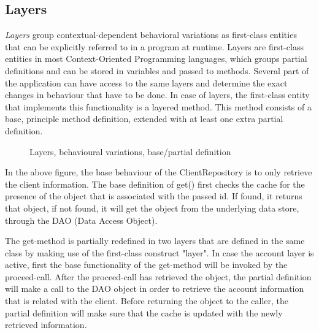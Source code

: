 \documentclass{acm_proc_article-sp}
\begin{document}
\subsection{Layers}
\textit{Layers} group contextual-dependent behavioral variations as first-class entities that can be explicitly referred to in a program at runtime. Layers are first-class entities in most Context-Oriented Programming languages, which groups partial definitions and can be stored in variables and passed to methods. Several part of the application can have access to the same layers and determine the exact changes in behaviour that have to be done. In case of layers, the first-class entity that implements this functionality is a layered method. This method consists of a base, principle method definition, extended with at least one extra partial definition.

\begin{figure}[H]
\centering
{}
\caption{Layers, behavioural variations, base/partial definition}
\end{figure}

In the above figure, the base behaviour of the ClientRepository is to only retrieve the client information. The base definition of get() first checks the cache for the presence of the object that is associated with the passed id. If found, it returns that object, if not found, it will get the object from the underlying data store, through the DAO (Data Access Object). 

The get-method is partially redefined in two layers that are defined in the same class by making use of the first-class construct "layer". In case the account layer is active, first the base functionality of the get-method will be invoked by the proceed-call. After the proceed-call has retrieved the object, the partial definition will make a call to the DAO object in order to retrieve the account information that is related with the client. Before returning the object to the caller, the partial definition will make sure that the cache is updated with the newly retrieved information. 
\end{document}
